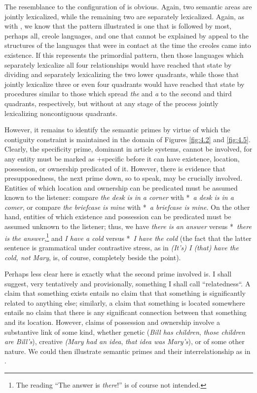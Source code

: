 The resemblance to the configuration of  is obvious. Again, two semantic areas are jointly lexicalized, while the remaining two are separately lexicalized. Again, as with , we know that the pattern illustrated is one that is followed by most, perhaps all, creole languages, and one that cannot be explained by appeal to the structures of the languages that were in contact at the time the creoles came into existence. If this represents the primordial pattern, then those languages which separately lexicalize all four relationships would have reached that state by dividing and separately lexicalizing the two lower quadrants, while those that jointly lexicalize three or even four quadrants would have reached that state by procedures similar to those which spread \textit{the} and \textit{a} to the second and third quadrants, respectively, but without at any stage of the process jointly lexicalizing noncontiguous quadrants.

However, it remains to identify the semantic primes by virtue of which the contiguity constraint is maintained in the domain of Figures \ref{fig:4.2} and \ref{fig:4.5}. Clearly, the specificity prime, dominant in article systems, cannot be involved, for any entity must be marked as +specific before it can have existence, location, possession, or ownership pre\-dicated of it. However, there is evidence that presupposedness, the next prime down, so to speak, may be crucially involved. Entities of which location and ownership can be predicated must be assumed known to the listener: compare \textit{the desk is in a corner} with *~\textit{a desk is in a comer}, or compare \textit{the briefcase is mine} with *~\textit{a briefcase is mine}. On the other hand, entities of which existence and possession can be predicated must be assumed unknown to the listener; thus, we have \textit{there is an answer} versus *~\textit{there is the answer},\footnote{The reading ``The answer is \textit{there}!'' is of course not intended.} and \textit{I have a cold} versus *~\textit{I have the cold} (the fact that the latter sentence is grammatical under contrastive stress, as in \textit{(It's) I (that) have the cold, not Mary}, is, of course, completely beside the point). 

Perhaps less clear here is exactly what the second prime in\-volved is. I shall suggest, very tentatively and provisionally, something I shall call ``relatedness``.  A claim that something exists entails no claim that that something is significantly related to anything else; similarly, a claim that something is located somewhere entails no claim that there is any significant connection between that something and its location. However, claims of possession and ownership involve a substantive link of some kind, whether genetic (\textit{Bill has children}, \textit{those children are Bill's}), creative \textit{(Mary had an idea}, \textit{that idea was Mary's}), or of some other nature. We could then illustrate semantic primes and their interrelationship as in . %

